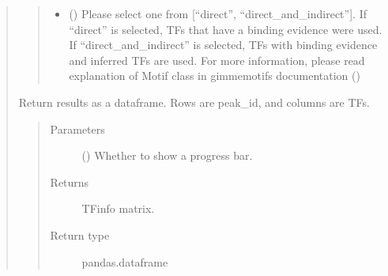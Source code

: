 \documentclass[letterpaper,10pt,english]{sphinxmanual}
\begin{document}
\begin{quote}
\begin{fulllineitems}
\begin{fulllineitems}
\begin{quote}
\begin{description}
\begin{itemize}
\item {} 
 () \textendash{} Please select one from {[}“direct”, “direct\_and\_indirect”{]}. If “direct” is selected, TFs that have a binding evidence were used.
If “direct\_and\_indirect” is selected, TFs with binding evidence and inferred TFs are used.
For more information, please read explanation of Motif class in gimmemotifs documentation ()

\end{itemize}

\end{description}\end{quote}

\end{fulllineitems}


\begin{fulllineitems}
\label{\detokenize{modules/celloracle.motif_analysis:celloracle.motif_analysis.TFinfo.to_dataframe}}
Return results as a dataframe.
Rows are peak\_id, and columns are TFs.
\begin{quote}\begin{description}
\item[{Parameters}] \leavevmode
{} () \textendash{} Whether to show a progress bar.

\item[{Returns}] \leavevmode
TFinfo matrix.

\item[{Return type}] \leavevmode
pandas.dataframe

\end{description}\end{quote}

\end{fulllineitems}



\end{fulllineitems}
\end{quote}
\end{document}

